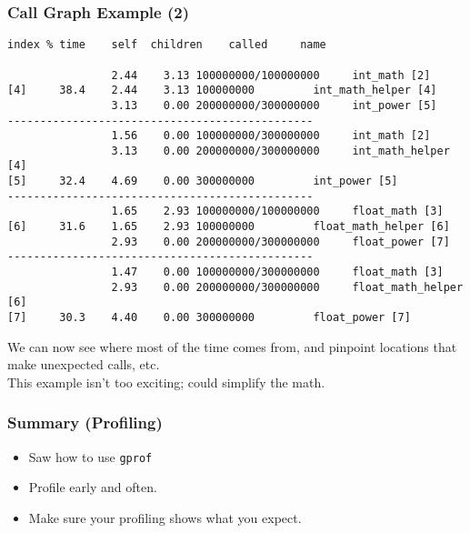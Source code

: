 \begin{frame}[fragile]
  \frametitle{Call Graph Example (2)}

\large
\begin{changemargin}{1.5cm}
  
  \begin{lstlisting}[basicstyle=\tiny]
index % time    self  children    called     name

                2.44    3.13 100000000/100000000     int_math [2]
[4]     38.4    2.44    3.13 100000000         int_math_helper [4]
                3.13    0.00 200000000/300000000     int_power [5]
-----------------------------------------------
                1.56    0.00 100000000/300000000     int_math [2]
                3.13    0.00 200000000/300000000     int_math_helper [4]
[5]     32.4    4.69    0.00 300000000         int_power [5]
-----------------------------------------------
                1.65    2.93 100000000/100000000     float_math [3]
[6]     31.6    1.65    2.93 100000000         float_math_helper [6]
                2.93    0.00 200000000/300000000     float_power [7]
-----------------------------------------------
                1.47    0.00 100000000/300000000     float_math [3]
                2.93    0.00 200000000/300000000     float_math_helper [6]
[7]     30.3    4.40    0.00 300000000         float_power [7]
  \end{lstlisting}

  
 We can now see where most of the time comes from, and pinpoint 
      locations that make unexpected calls, etc.\\[1em]
 This example isn't too exciting; could simplify the math.
 \end{changemargin}
\end{frame}

\begin{frame}
  \frametitle{Summary (Profiling)}
\large
\begin{changemargin}{1.5cm}
  
  \begin{itemize}
    \item Saw how to use {\tt gprof}
    \item Profile early and often.
    \item Make sure your profiling shows what you expect. 
  \end{itemize}
  \end{changemargin}
\end{frame}






